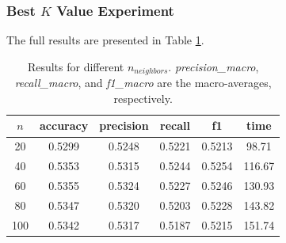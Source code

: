 \documentclass[times, twocolumn]{article}
\begin{document}
\subsubsection{Best $K$ Value Experiment}
The full results are presented in Table \ref{table:result}.
\begin{table}
    \begin{center}
        \begin{tabular}{|c||c|c|c|c|c|} \hline
           $n$ & accuracy & precision & recall & f1 & time   \\
           \hline
            20  & 0.5299 & 0.5248 & 0.5221 & 0.5213 & 98.71  \\
            40  & 0.5353 & 0.5315 & 0.5244 & 0.5254 & 116.67 \\
            60  & 0.5355 & 0.5324 & 0.5227 & 0.5246 & 130.93 \\
            80  & 0.5347 & 0.5320 & 0.5203 & 0.5228 & 143.82 \\
            100 & 0.5342 & 0.5317 & 0.5187 & 0.5215 & 151.74 \\
            \hline
        \end{tabular}
        \caption{Results for different $n_{neighbors}$. \textit{precision\_macro}, \textit{recall\_macro}, and \textit{f1\_macro} are the macro-averages, respectively.}
        \label{table:result}
    \end{center}
\end{table}
\end{document}
